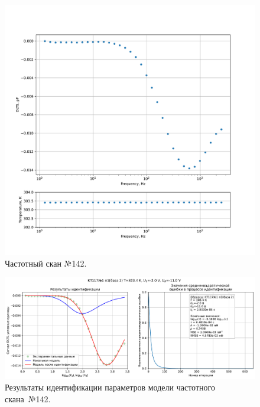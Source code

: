 \begin{figure}[!ht]
    \centering
    \includegraphics[width=1\textwidth]{../plots/КТ117№1_п1(база 2)_2500Гц-1Гц_1пФ_+30С_-2В-11В_200мВ_20мкс_шаг_0,1.pdf}
    \caption{Частотный скан №142.}
    \label{pic:frequency_scan_142}
\end{figure}

\begin{figure}[!ht]
    \centering
    \includegraphics[width=1\textwidth]{../plots/КТ117№1_п1(база 2)_2500Гц-1Гц_1пФ_+30С_-2В-11В_200мВ_20мкс_шаг_0,1_model.pdf}
    \caption{Результаты идентификации параметров модели частотного скана~№142.}
    \label{pic:frequency_scan_model142}
\end{figure}

\pagebreak


